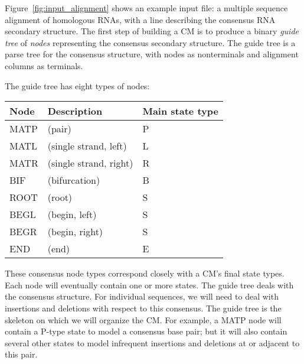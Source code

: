 \documentclass[11pt]{article}
\newif\ifdraft
\begin{document}
Figure~\ref{fig:input_alignment} shows an example input file: a
multiple sequence alignment of homologous RNAs, with a line describing
the consensus RNA secondary structure. The first step of building a CM
is to produce a binary \emph{guide tree} of \emph{nodes} representing
the consensus secondary structure. The guide tree is a parse tree for
the consensus structure, with nodes as nonterminals and alignment
columns as terminals.

\ifdraft
\begin{figure}[t]
\begin{center}
\texttt{[image: Figures/input\_alignment]}
\end{center}
\caption{\textbf{An example RNA sequence family.} Top: a toy multiple
alignment of three sequences, with 28 total columns, 24 of which will
be modeled as consensus positions. The [structure] line annotates the
consensus secondary structure: $>$ and $<$ symbols mark base pairs,
x's mark consensus single stranded positions, and .'s mark
``insert'' columns that will not be considered part of the consensus
model. Bottom: the secondary structure of the ``human'' sequence.} 
\label{fig:input_alignment}
\end{figure}
\fi

The guide tree has eight types of nodes:

\vspace{0.5em}
\begin{tabular}{lll}
Node      & Description        &  Main state type          \\ \hline
MATP  & (pair)                 & P \\
MATL  & (single strand, left)  & L \\
MATR  & (single strand, right) & R \\
BIF   & (bifurcation)          & B \\
ROOT  & (root)                 & S \\
BEGL  & (begin, left)          & S \\
BEGR  & (begin, right)         & S \\
END   & (end)                  & E \\
\end{tabular}
\vspace{0.5em}
 
These consensus node types correspond closely with a CM's final state
types. Each node will eventually contain one or more states. The guide
tree deals with the consensus structure. For individual sequences, we
will need to deal with insertions and deletions with respect to this
consensus. The guide tree is the skeleton on which we will organize
the CM. For example, a MATP node will contain a P-type state to
model a consensus base pair; but it will also contain several other
states to model infrequent insertions and deletions at or adjacent to
this pair.
\end{document}
